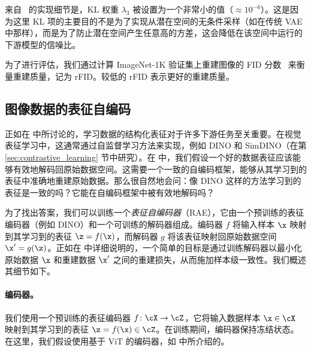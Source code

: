 \documentclass[../../book-main_zh.tex]{subfiles}
\begin{document}
来自~\citep{rombach2022high} 的实现细节是，KL 权重 $\lambda_3$ 被设置为一个非常小的值（$\approx 10^{-6}$）。这是因为这里 KL 项的主要目的不是为了实现从潜在空间的无条件采样（如在传统 VAE 中那样），而是为了防止潜在空间产生任意高的方差，这会降低在该空间中运行的下游模型的信噪比。

为了进行评估，我们通过计算 ImageNet-1K 验证集上重建图像的 FID 分数~\citep{heusel2017gans} 来衡量重建质量，记为 rFID。较低的 rFID 表示更好的重建质量。








\subsection{图像数据的表征自编码}
\label{sec:RAE-implement}

\newcommand{\gc}[1]{\textcolor{deemph}{#1}}
\newcommand{\tablestyle}[2]{\setlength{\tabcolsep}{#1}\renewcommand{\arraystretch}{#2}\centering\scriptsize}



正如在  中所讨论的，学习数据的结构化表征对于许多下游任务至关重要。在视觉表征学习中，这通常通过自监督学习方法来实现，例如 DINO \cite{caron2021emerging} 和 SimDINO（在第 \ref{sec:contrastive_learning} 节中研究）。在  中，我们假设一个好的数据表征应该能够有效地解码回原始数据空间。这需要一个一致的自编码框架，能够从其学习到的表征中准确地重建原始数据。那么很自然地会问：像 DINO 这样的方法学习到的表征是一致的吗？它能在自编码框架中被有效地解码吗？

为了找出答案，我们可以训练一个\textit{表征自编码器}（RAE），它由一个预训练的表征编码器（例如 DINO）和一个可训练的解码器组成。编码器 $f$ 将输入样本 $\x$ 映射到其学习到的表征 $\z = f(\x)$，而解码器 $g$ 将该表征映射回原始数据空间 $\x'=g(\z)$。正如在  中详细说明的，一个简单的目标是通过训练解码器以最小化原始数据 $\x$ 和重建数据 $\x'$ 之间的重建损失，从而施加样本级一致性。我们概述其细节如下。

\paragraph{编码器。} 我们使用一个预训练的表征编码器 $f \colon \cX \to \cZ$，它将输入数据样本 $\x \in \cX$ 映射到其学习到的表征 $\z = f(\x) \in \cZ$。在训练期间，编码器保持冻结状态。在这里，我们假设使用基于 ViT 的编码器，如  中所介绍的。
\end{document}
